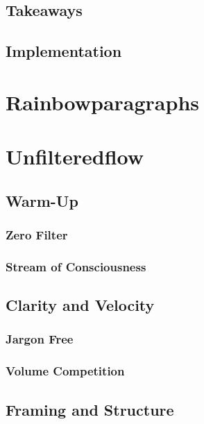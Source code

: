 \documentclass[12pt]{article}
\begin{document}
\subsection{Takeaways}
\subsection{Implementation}

\section{Rainbowparagraphs}

\section{Unfilteredflow}
\subsection{Warm-Up}
\subsubsection{Zero Filter}
\subsubsection{Stream of Consciousness}
\subsection{Clarity and Velocity}
\subsubsection{Jargon Free}
\subsubsection{Volume Competition}
\subsection{Framing and Structure}
\end{document}
